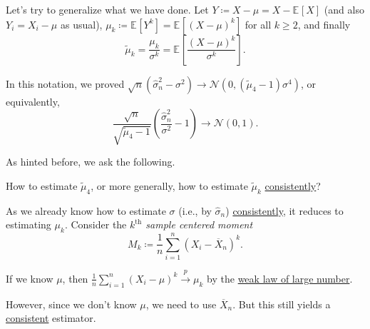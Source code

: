 Let's try to generalize what we have done. Let \(Y \coloneqq X - \mu = X - \mathbb{E}_{}[X] \) (and also \(Y_i = X_i - \mu \) as usual), \(\mu _k \coloneqq \mathbb{E}_{}[Y^k] = \mathbb{E}_{}[(X - \mu )^k] \) for all \(k \geq 2\), and finally
\[
	\widetilde{\mu} _k
	= \frac{\mu _k}{\sigma ^k}
	= \mathbb{E}_{}\left[ \frac{(X-\mu )^k}{\sigma ^k} \right] .
\]

\begin{prev}
	In this notation, we proved \(\sqrt{n} (\hat{\sigma} _n^2 - \sigma ^2) \to \mathcal{N} (0, (\widetilde{\mu} _4 - 1)\sigma ^4) \), or equivalently,
	\[
		\frac{\sqrt{n} }{\sqrt{\widetilde{\mu} _4 - 1} } \left( \frac{\hat{\sigma} _n^2}{\sigma ^2} - 1 \right) \to \mathcal{N} (0, 1).
	\]
\end{prev}
As hinted before, we ask the following.

\begin{problem*}
	How to estimate \(\widetilde{\mu} _4\), or more generally, how to estimate \(\widetilde{\mu} _k\) \hyperref[def:consistent]{consistently}?
\end{problem*}

As we already know how to estimate \(\sigma \) (i.e., by \(\hat{\sigma} _n\)) \hyperref[def:consistent]{consistently}, it reduces to estimating \(\mu _k\). Consider the \emph{\(k^{\text{th} }\) sample centered moment}
\[
	M_k
	\coloneqq \frac{1}{n} \sum_{i=1}^{n} (X_i - \overline{X} _n)^k .
\]

\begin{note}
	If we know \(\mu \), then \(\frac{1}{n} \sum_{i=1}^{n} (X_i - \mu )^k \overset{p}{\to} \mu _k\) by the \hyperref[thm:WLLN]{weak law of large number}.
\end{note}

However, since we don't know \(\mu \), we need to use \(\overline{X} _n\). But this still yields a \hyperref[def:consistent]{consistent} estimator.

